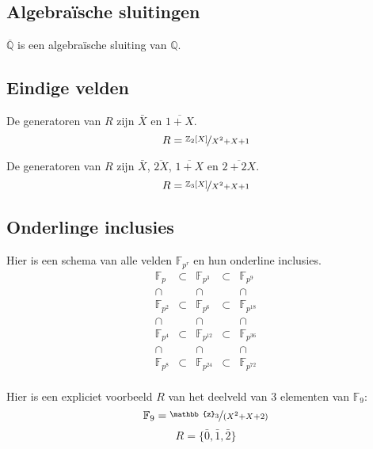 \documentclass[main.tex]{subfiles}
\begin{document}
\subsection{Algebra\"ische sluitingen}

\begin{vb}
  $\overline{\mathbb{Q}}$ is een algebra\"ische sluiting van $\mathbb{Q}$.
\end{vb}

\subsection{Eindige velden}
\begin{vb}
  De generatoren van $R$ zijn $\bar{X}$ en $\overline{1+X}$.
  \[ R = \nicefrac{\mathbb{Z}_{2}[X]}{X^{2}+X+1} \]
\end{vb}

\begin{vb}
  De generatoren van $R$ zijn $\bar{X}$, $\overline{2X}$, $\overline{1+X}$ en $\overline{2+2X}$.
  \[ R = \nicefrac{\mathbb{Z}_{3}[X]}{X^{2}+X+1} \]
\end{vb}


\subsection{Onderlinge inclusies}

\begin{vb}
  Hier is een schema van alle velden $\mathbb{F}_{p^{r}}$ en hun onderline inclusies.
\[
\begin{array}{cccccccc}
  \mathbb{F}_{p} &\subset& \mathbb{F}_{p^{3}} &\subset& \mathbb{F}_{p^{9}} \\
  \cap & & \cap && \cap \\
  \mathbb{F}_{p^{2}} &\subset& \mathbb{F}_{p^{6}} &\subset& \mathbb{F}_{p^{18}} \\
  \cap & & \cap && \cap \\
  \mathbb{F}_{p^{4}} &\subset& \mathbb{F}_{p^{12}} &\subset& \mathbb{F}_{p^{36}} \\
  \cap & & \cap && \cap \\
  \mathbb{F}_{p^{8}} &\subset& \mathbb{F}_{p^{24}} &\subset& \mathbb{F}_{p^{72}} \\
\end{array}
\]
\end{vb}

\begin{vb}
  Hier is een expliciet voorbeeld $R$ van het deelveld van $3$ elementen van $\mathbb{F}_{9}$:
  \[ \mathbb{F}_{9} = \nicefrac{\mathbb{z}_{3}}{(X^{2}+X+2)} \]
  \[ R = \{\bar{0},\bar{1},\bar{2}\}\]
\end{vb}
\end{document}
